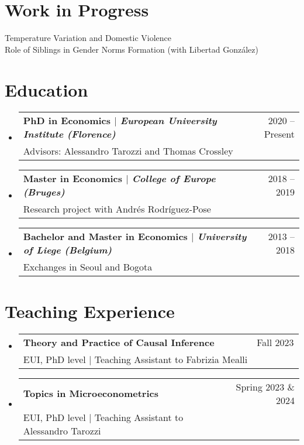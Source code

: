 \documentclass[11pt]{article}
\makeatletter
\newcommand{\CVSubheading}[4]{
  \vspace{-2pt}\item
    \begin{tabular*}{0.97\textwidth}[t]{l@{\extracolsep{\fill}}r}
      \textbf{#1} & #2 \\
      \small#3 & \small #4 \\
    \end{tabular*}\vspace{-7pt}
}
\newcommand{\CVSubHeadingListStart}{\begin{itemize}[leftmargin=0.5cm, label={}]}
\newcommand{\CVSubHeadingListEnd}{\end{itemize}}
\makeatother
\begin{document}

\section{Work in Progress}
 \begin{itemize}[leftmargin=0.5cm, label={}]
    \small{\item{
	Temperature Variation and Domestic Violence\\
	\vspace{.2cm}
	Role of Siblings in Gender Norms Formation (with Libertad González)
    }}
 \end{itemize}
 


\section{Education}
  \CVSubHeadingListStart
    \CVSubheading
      {{PhD in Economics $|$ \emph{\small{European University Institute (Florence)}}}}{2020 -- Present}
      {Advisors: Alessandro Tarozzi and Thomas Crossley}{}
    \CVSubheading
      {{Master in Economics $|$ \emph{\small{College of Europe (Bruges)}}}}{2018 -- 2019}
      {Research project with Andrés Rodríguez-Pose}{}
    \CVSubheading
      {{Bachelor and Master in Economics $|$ \emph{\small{University of Liege (Belgium)}}}}{2013 -- 2018}
      {Exchanges in Seoul and Bogota}{}
  \CVSubHeadingListEnd
  

 

\section{Teaching Experience}
  \CVSubHeadingListStart
     \CVSubheading
      {{Theory and Practice of Causal Inference}}{Fall 2023}
      {EUI, PhD level $|$ Teaching Assistant to Fabrizia Mealli} {}
    \CVSubheading
      {{Topics in Microeconometrics}}{Spring 2023 \& 2024}
      {EUI, PhD level $|$ Teaching Assistant to Alessandro Tarozzi} {}
  \CVSubHeadingListEnd
\end{document}
